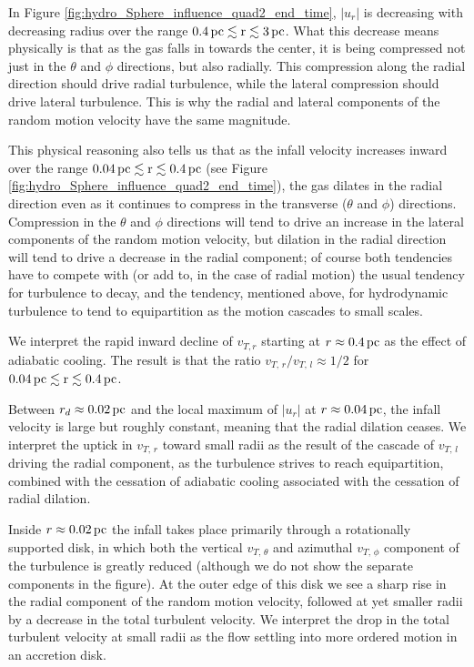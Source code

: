 \documentclass[../dissertation.tex]{subfiles}
\begin{document}
In Figure \ref{fig:hydro_Sphere_influence_quad2_end_time}, $|u_r|$ is
decreasing with decreasing radius over the range $0.4\,\rm pc\lesssim r\lesssim 3\,\rm pc$.
What this decrease means physically is that as the
gas falls in towards the center, it is being compressed not just
in the $\theta$ and $\phi$ directions, but also radially. This
compression along the radial direction should drive radial turbulence,
while the lateral compression should drive lateral
turbulence. This is why the radial and lateral components of the random motion
velocity have the same magnitude. 

This physical reasoning also tells us that as the infall velocity
increases inward over the range $0.04\,\rm pc\lesssim r\lesssim 0.4\,\rm pc$
(see Figure \ref{fig:hydro_Sphere_influence_quad2_end_time}), 
the gas dilates in the radial direction even as it continues to compress 
in the transverse ($\theta$ and $\phi$) directions. Compression in the
$\theta$ and $\phi$ directions will tend to drive an increase in the
lateral components of the random motion velocity, but dilation
in the radial direction will tend to drive a decrease in the radial
component; of course both tendencies have to compete with (or add to,
in the case of radial motion) the usual tendency for turbulence to
decay, and the tendency, mentioned above, for hydrodynamic turbulence
to tend to equipartition as the motion cascades to small scales. 

We interpret the rapid inward decline of $v_{T,r}$
starting at $r\approx0.4\,\rm pc$ as the effect of adiabatic cooling. The result
is that the ratio $v_{T,\, r}/v_{T,\, l}\approx 1/2$ for $0.04\,\rm pc\lesssim r\lesssim 0.4\,\rm pc$. 

Between $r_d\approx0.02\,\rm pc$ and the local maximum of $|u_r|$ at
$r\approx0.04\,\rm pc$, the infall velocity is large but roughly constant,
meaning that the radial dilation ceases. We interpret the uptick in
$v_{T,\, r}$ toward small radii as the result of the cascade of
$v_{T,\,l}$ driving the radial component, as the turbulence strives
to reach equipartition, combined with the cessation of adiabatic cooling 
associated with the cessation of radial dilation.  

Inside $r\approx 0.02\,\rm pc$ the infall takes place primarily through a rotationally 
supported disk, in which both the vertical $v_{T,\, \theta}$ and 
azimuthal $v_{T,\, \phi}$ component of the turbulence is greatly reduced 
(although we do not show the separate components in the figure). At the 
outer edge of this 
disk we see a sharp rise in the radial component of the random motion velocity, 
followed at yet smaller radii by a decrease in the total turbulent velocity. 
We interpret the drop in the total turbulent
velocity at small radii as the flow settling into more ordered motion in an accretion disk.
\end{document}
